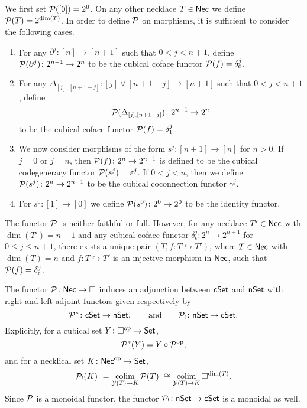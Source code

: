 We first set $\mathcal{P}([0])=2^0$.
On any other necklace $T \in \mathsf{Nec}$ we define $\mathcal{P}(T) = 2^{\dim(T)}$.
In order to define $\mathcal{P}$ on morphisms, it is sufficient to consider the following cases.
\begin{enumerate}
	\item For any $\partial^j \colon [n] \to [n+1]$ such that $0< j<{n+1}$, define $\mathcal{P}(\partial^j) \colon 2^{n-1}\to 2^{n}$ to be the cubical coface functor $\mathcal{P}(f)= \delta_0^{j}$.

	\item For any $\Delta_{[j], [n+1-j]} \colon [j] \vee [n+1-j] \to [n+1]$ such that $0<j<n+1$, define
	\[
	\mathcal{P}(\Delta_{[j], [n+1-j]}) \colon 2^{n-1}\to 2^{n}
	\]
	to be the cubical coface functor $\mathcal{P}(f)=\delta_1^{j}$.

	\item We now consider morphisms of the form $s^j \colon [n+1] \to [n]$ for $n>0$.
	If $j=0$ or $j=n$, then $\mathcal{P}(f) \colon 2^n \to 2^{n-1}$ is defined to be the cubical codegeneracy functor $\mathcal{P}(s^j)= \varepsilon^{j}$.
	If $0<j<n$, then we define $\mathcal{P}(s^j) \colon 2^n \to 2^{n-1}$ to be the cubical coconnection functor $\gamma^{j}$.

	\item For $s^0 \colon [1] \to [0]$ we define $\mathcal{P}(s^0) \colon 2^0 \to 2^0$ to be the identity functor.
\end{enumerate}

\begin{remark}
	The functor $\mathcal{P}$ is neither faithful or full.
	However, for any necklace $T' \in \mathsf{Nec}$ with $\dim(T')=n+1$ and any cubical coface functor $\delta_{\epsilon}^j \colon 2^n \to 2^{n+1}$ for $0 \leq j \leq n+1$, there exists a unique pair $(T, f \colon T \hookrightarrow T')$, where $T \in \mathsf{Nec}$ with $\dim(T)=n$ and $f \colon T \hookrightarrow T'$ is an injective morphism in $\mathsf{Nec}$, such that $\mathcal{P}(f) = \delta_{\epsilon}^j $.
\end{remark}

The functor $\mathcal{P} \colon \mathsf{Nec} \to \square$ induces an adjunction between $\mathsf{cSet}$ and $\mathsf{nSet}$ with right and left adjoint functors given respectively by
\[
\mathcal{P}^\ast \colon \mathsf{cSet} \to \mathsf{nSet},
\qquad \text{and} \qquad
\mathcal{P}_{!} \colon \mathsf{nSet} \to \mathsf{cSet}.
\]
Explicitly, for a cubical set $Y \colon \square^{\mathrm{op}} \to \mathsf{Set}$,
\[
\mathcal{P}^\ast(Y)= Y \circ \mathcal{P}^{\mathrm{op}},
\]
and for a necklical set $K \colon \mathsf{Nec}^{\mathrm{op}} \to \mathsf{Set}$,
\[
\mathcal{P}_{!}(K) \ =
\operatorname*{colim}_{\mathcal{Y}(T) \to K} \mathcal{P}(T) \ \cong
\operatorname*{colim}_{\mathcal{Y}(T) \to K} \square^{\dim(T)}.
\]
Since $\mathcal{P}$ is a monoidal functor, the functor $\mathcal{P}_{!} \colon \mathsf{nSet} \to \mathsf{cSet}$ is a monoidal as well.


